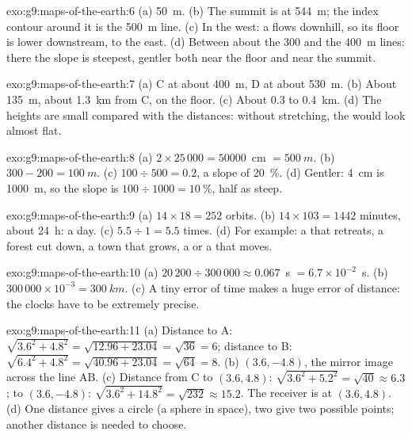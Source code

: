 \begin{solution}{exo:g9:maps-of-the-earth:6}
(a) \qty{50}{m}. (b) The summit is at \qty{544}{m}; the index contour around
it is the \qty{500}{m} line. (c) In the west: a  flows downhill, so
its floor is lower downstream, to the east. (d) Between about the 300 and
the \qty{400}{m} lines: there the slope is steepest, gentler both near the
 floor and near the summit.
\end{solution}

\begin{solution}{exo:g9:maps-of-the-earth:7}
(a) C at about \qty{400}{m}, D at about \qty{530}{m}. (b) About
\qty{135}{m}, about \qty{1.3}{km} from C, on the  floor. (c) About
0.3 to \qty{0.4}{km}. (d) The heights are small compared with the
distances: without stretching, the  would look almost flat.
\end{solution}

\begin{solution}{exo:g9:maps-of-the-earth:8}
(a) $2 \times 25\,000 = \num{50000}$~cm $= \qty{500}{m}$. (b) $300 - 200 =
\qty{100}{m}$. (c) $100 \div 500 = 0.2$, a slope of \qty{20}{\%}. (d) Gentler:
\qty{4}{cm} is \qty{1000}{m}, so the slope is $100 \div 1000 = \qty{10}{\%}$,
half as steep.
\end{solution}

\begin{solution}{exo:g9:maps-of-the-earth:9}
(a) $14 \times 18 = 252$ orbits. (b) $14 \times 103 = 1442$ minutes, about
\qty{24}{h}: a day. (c) $5.5 \div 1 = 5.5$ times. (d) For example: a 
that retreats, a forest cut down, a town that grows, a  or a  that
moves.
\end{solution}

\begin{solution}{exo:g9:maps-of-the-earth:10}
(a) $20\,200 \div 300\,000 \approx 0.067$~s $= 6.7 \times 10^{-2}$~s.
(b) $300\,000 \times 10^{-3} = \qty{300}{km}$. (c) A tiny error of time
makes a huge error of distance: the clocks have to be extremely precise.
\end{solution}

\begin{solution}{exo:g9:maps-of-the-earth:11}
(a) Distance to A: $\sqrt{3.6^2 + 4.8^2} = \sqrt{12.96 + 23.04} =
\sqrt{36} = 6$; distance to B: $\sqrt{6.4^2 + 4.8^2} = \sqrt{40.96 +
23.04} = \sqrt{64} = 8$. (b) $(3.6, -4.8)$, the mirror image across the
line AB. (c) Distance from C to $(3.6, 4.8)$: $\sqrt{3.6^2 + 5.2^2} =
\sqrt{40} \approx 6.3$; to $(3.6, -4.8)$: $\sqrt{3.6^2 + 14.8^2} =
\sqrt{232} \approx 15.2$. The receiver is at $(3.6, 4.8)$. (d) One distance
gives a circle (a sphere in space), two give two possible points; another
distance is needed to choose.
\end{solution}

